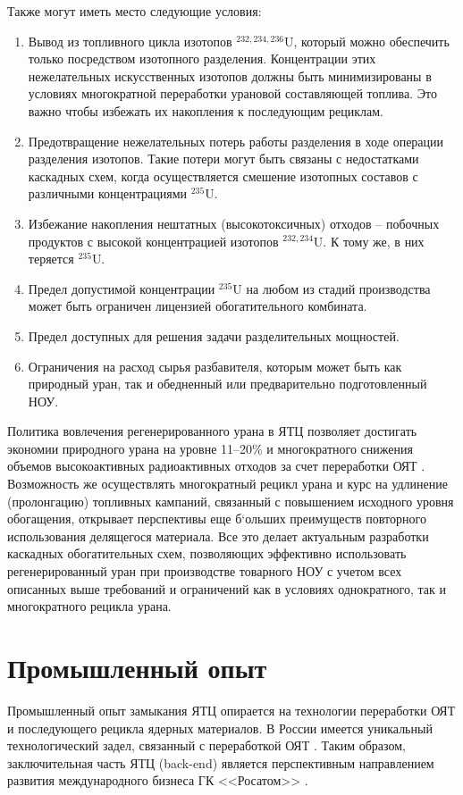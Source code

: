 Также могут иметь место следующие условия:
\begin{enumerate}
  \item Вывод из топливного цикла изотопов $^{232,234,236}$U, который можно обеспечить только посредством изотопного разделения. Концентрации этих нежелательных искусственных изотопов должны быть минимизированы в условиях многократной переработки урановой составляющей топлива. Это важно чтобы избежать их накопления к последующим рециклам.
  \item Предотвращение нежелательных потерь работы разделения в ходе операции разделения изотопов. Такие потери могут быть связаны с недостатками каскадных схем, когда осуществляется смешение изотопных составов с различными концентрациями $^{235}$U. 
  \item Избежание накопления нештатных (высокотоксичных) отходов -- побочных продуктов с высокой концентрацией изотопов $^{232,234}$U. К тому же, в них теряется $^{235}$U.
  \item Предел допустимой концентрации $^{235}$U на любом из стадий производства может быть ограничен лицензией обогатительного комбината.
  \item Предел доступных для решения задачи разделительных мощностей.
  \item Ограничения на расход сырья разбавителя, которым может быть как природный уран, так и обедненный или предварительно подготовленный НОУ.
\end{enumerate}

Политика вовлечения регенерированного урана в ЯТЦ позволяет достигать экономии природного урана на уровне 11--20\% и многократного снижения объемов высокоактивных радиоактивных отходов за счет переработки ОЯТ \cite{delculAnalysisReuseUranium2009}. Возможность же осуществлять многократный рецикл урана и курс на удлинение (пролонгацию) топливных кампаний, связанный с повышением исходного уровня обогащения, открывает перспективы еще б`ольших преимуществ повторного использования делящегося материала.
Все это делает актуальным разработки каскадных обогатительных схем, позволяющих эффективно использовать регенерированный уран при производстве товарного НОУ с учетом всех описанных выше требований и ограничений как в условиях однократного, так и многократного рецикла урана.

\section{Промышленный опыт}\label{sec:ch1/sec1}
Промышленный опыт замыкания ЯТЦ опирается на технологии переработки ОЯТ и последующего рецикла ядерных материалов.
В России имеется уникальный технологический задел, связанный с переработкой ОЯТ \cite{balihinSostoyaniiPerspektivahRazvitiya2018}.
Таким образом, заключительная часть ЯТЦ (back-end) является перспективным направлением развития международного бизнеса ГК <<Росатом>> \cite{efimenkoProblemyPerspektivyRazvitiya2017}. 

